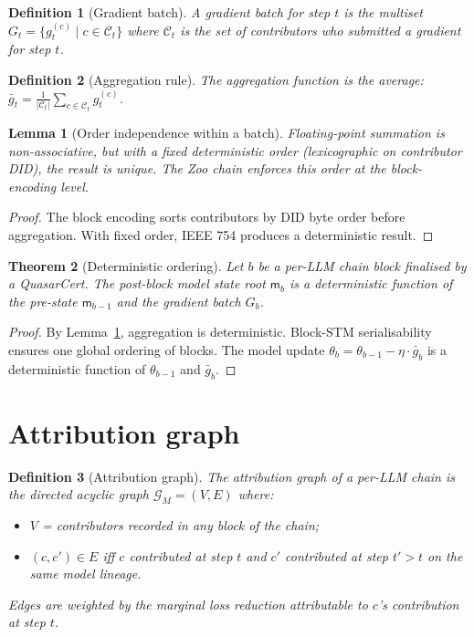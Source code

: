 \documentclass[11pt]{article}
\newtheorem{theorem}{Theorem}
\newtheorem{lemma}[theorem]{Lemma}
\newtheorem{definition}{Definition}
\begin{document}
\begin{definition}[Gradient batch]
\label{def:batch}
A \emph{gradient batch} for step $t$ is the multiset
$G_t = \{ g_t^{(c)} \mid c \in \mathcal{C}_t \}$ where
$\mathcal{C}_t$ is the set of contributors who submitted a gradient
for step $t$.
\end{definition}

\begin{definition}[Aggregation rule]
\label{def:agg}
The aggregation function is the average:
$\bar{g}_t = \frac{1}{|\mathcal{C}_t|} \sum_{c \in \mathcal{C}_t} g_t^{(c)}$.
\end{definition}

\begin{lemma}[Order independence within a batch]
\label{lem:order-indep}
Floating-point summation is non-associative, but with a fixed
deterministic order (lexicographic on contributor DID), the result
is unique. The Zoo chain enforces this order at the block-encoding
level.
\end{lemma}

\begin{proof}
The block encoding sorts contributors by DID byte order before
aggregation. With fixed order, IEEE 754 produces a deterministic
result.
\end{proof}

\begin{theorem}[Deterministic ordering]
\label{thm:det-order}
Let $b$ be a per-LLM chain block finalised by a QuasarCert. The
post-block model state root $\mathsf{m}_b$ is a deterministic
function of the pre-state $\mathsf{m}_{b-1}$ and the gradient batch
$G_b$.
\end{theorem}

\begin{proof}
By Lemma~\ref{lem:order-indep}, aggregation is deterministic.
Block-STM serialisability~\cite{dagevm-lean} ensures one global
ordering of blocks. The model update
$\theta_{b} = \theta_{b-1} - \eta \cdot \bar{g}_b$ is a deterministic
function of $\theta_{b-1}$ and $\bar{g}_b$.
\end{proof}

\section{Attribution graph}
\label{sec:attr}

\begin{definition}[Attribution graph]
\label{def:attr}
The \emph{attribution graph} of a per-LLM chain is the directed
acyclic graph $\mathcal{G}_M = (V, E)$ where:
\begin{itemize}[nosep]
  \item $V$ = contributors recorded in any block of the chain;
  \item $(c, c') \in E$ iff $c$ contributed at step $t$ and $c'$
        contributed at step $t' > t$ on the same model lineage.
\end{itemize}
Edges are weighted by the marginal loss reduction attributable to
$c$'s contribution at step $t$.
\end{definition}
\end{document}
